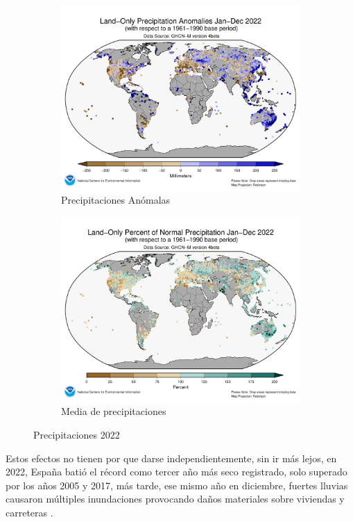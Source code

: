 \begin{figure} [H]
	\centering
	\begin{subfigure}{.5\textwidth}
		\centering
		\includegraphics[width=.9\linewidth]{fig/map-prcp-202201-202212.png}
		\caption{Precipitaciones Anómalas}
		\label{fig:sub1}
	\end{subfigure}%
	\begin{subfigure}{.5\textwidth}
		\centering
		\includegraphics[width=.9\linewidth]{fig/map-prcp-percent-202201-202212.png}
		\caption{Media de precipitaciones}
		\label{fig:sub2}
	\end{subfigure}
	\caption{Precipitaciones 2022}
	\label{fig:ej19}
\end{figure}

Estos efectos no tienen por que darse independientemente, sin ir más lejos, en 2022, España batió el récord como tercer año más seco registrado, solo superado por los años 2005 y 2017, más tarde, ese mismo año en diciembre, fuertes lluvias causaron múltiples inundaciones provocando daños materiales sobre viviendas y carreteras \cite{NCEIWebPreci}.\newline
\newline




